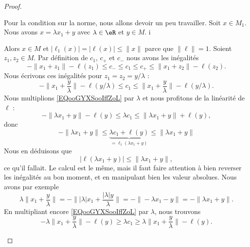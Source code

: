 \begin{proof}
\begin{subproof}
			Pour la condition sur la norme, nous allons devoir un peu travailler.
			Soit \( x\in M_1\). Nous avons \( x=\lambda x_1+y\) avec \( \lambda\in \eR\) et \( y\in M\). i

			\begin{subproof}
				\spitem[Si \( \lambda=0\)]
				Alors \( x\in M\) et \( |\ell_1(x)|=|\ell(x)|\leq \| x \|\) parce que \( \| \ell \|=1\).
				Soient \( z_1,z_2\in M\). Par définition de \( c_1\), \( c_+\) et \( c_-\) nous avons les inégalités
				\begin{equation}
					-\| x_1+z_1 \|-\ell(z_1)\leq c_-\leq c_1\leq c_+\leq \| x_1+z_2 \|-\ell(z_2).
				\end{equation}
				Nous écrivons ces inégalités pour \( z_1=z_2=y/\lambda\) :
				\begin{equation}        \label{EQooGYXSooIffZoL}
					-\| x_1+\frac{ y }{ \lambda } \|-\ell(y/\lambda)\leq c_1\leq \| x_1+\frac{ y }{ \lambda } \|-\ell(y/\lambda).
				\end{equation}
				\spitem[Si \( \lambda>0\)]
				Nous multiplions \eqref{EQooGYXSooIffZoL} par \( \lambda\) et nous profitons de la linéarité de \( \ell\) :
				\begin{equation}
					-\| \lambda x_1+y \|-\ell(y)\leq \lambda c_1\leq \| \lambda x_1+y \|+\ell(y),
				\end{equation}
				donc
				\begin{equation}        \label{EQooYRULooBebNTq}
					-\| \lambda x_1+y \|\leq \underbrace{\lambda c_1+\ell(y)}_{=\ell_1(\lambda x_1+y)}\leq \| \lambda x_1+y \|
				\end{equation}
				Nous en déduisons que
				\begin{equation}
					| \ell(\lambda x_1+y) |\leq \| \lambda x_1+y \|,
				\end{equation}
				ce qu'il fallait.
				\spitem[Si \( \lambda<0\)]
				Le calcul est le même, mais il faut faire attention à bien reverser les inégalités au bon moment, et en manipulant bien les valeur absolues. Nous avons par exemple
				\begin{equation}
					\lambda\|  x_1+\frac{ y }{ \lambda } \|=-\big\| | \lambda |x_1+\frac{ | \lambda |y }{ \lambda } \big\|=-\| -\lambda x_1-y \|=-\| \lambda x_1+y \|.
				\end{equation}
				En multipliant encore \eqref{EQooGYXSooIffZoL} par \( \lambda\), nous trouvons
				\begin{equation}
					-\lambda\| x_1+\frac{ y }{ \lambda } \|-\ell(y)\geq \lambda c_1\geq \lambda\| x_1+\frac{ y }{ \lambda } \|-\ell(y).

\end{equation}
\end{subproof}
\end{subproof}
\end{proof}
